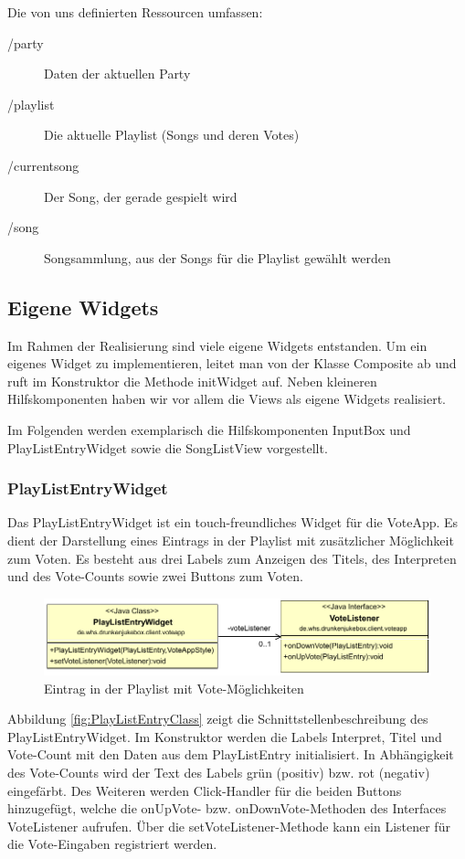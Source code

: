 Die von uns definierten Ressourcen umfassen:
\begin{description}
	\item[/party] Daten der aktuellen Party
	\item[/playlist] Die aktuelle Playlist (Songs und deren Votes)
	\item[/currentsong] Der Song, der gerade gespielt wird
	\item[/song] Songsammlung, aus der Songs für die Playlist gewählt werden
\end{description}

\subsection{Eigene Widgets}
Im Rahmen der Realisierung sind viele eigene Widgets entstanden. Um ein eigenes Widget zu implementieren, leitet man von der Klasse Composite ab und ruft im Konstruktor die Methode initWidget auf. Neben kleineren Hilfskomponenten haben wir vor allem die Views als eigene Widgets realisiert.

Im Folgenden werden exemplarisch die Hilfskomponenten InputBox und PlayListEntryWidget sowie die SongListView vorgestellt.

\subsubsection{PlayListEntryWidget}
Das PlayListEntryWidget ist ein touch-freundliches Widget für die VoteApp. Es dient der Darstellung eines Eintrags in der Playlist mit zusätzlicher Möglichkeit zum Voten. Es besteht aus drei Labels zum Anzeigen des Titels, des Interpreten und des Vote-Counts sowie zwei Buttons zum Voten. 

\begin{figure}[tbh]
	\centering
	\includegraphics[width=0.7\linewidth]{Bilder/PlayListEntry}
	\caption{Eintrag in der Playlist mit Vote-Möglichkeiten}
	\label{fig:PlayListEntry}
\end{figure}

Abbildung \ref{fig:PlayListEntryClass} zeigt die Schnittstellenbeschreibung des PlayListEntryWidget. Im Konstruktor werden die Labels Interpret, Titel und Vote-Count mit den Daten aus dem PlayListEntry initialisiert. In Abhängigkeit des Vote-Counts wird der Text des Labels grün (positiv) bzw. rot (negativ) eingefärbt. Des Weiteren werden Click-Handler für die beiden Buttons hinzugefügt, welche die onUpVote- bzw. onDownVote-Methoden des Interfaces VoteListener aufrufen. Über die setVoteListener-Methode kann ein Listener für die Vote-Eingaben registriert werden.

